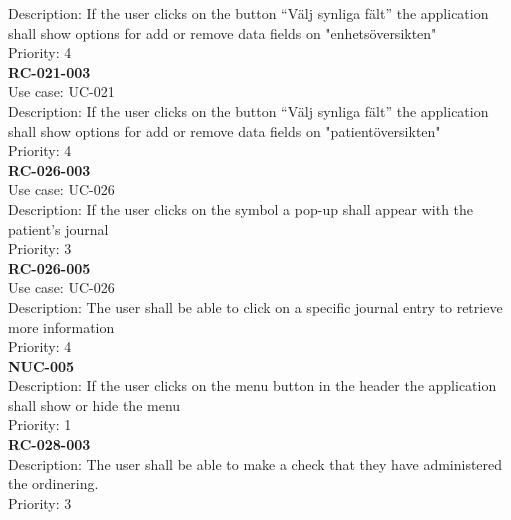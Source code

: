 Description: If the user clicks on the button “Välj synliga fält” the application shall show options for add or remove data fields on "enhetsöversikten"  \\
Priority: 4 \\
\newline
\textbf{RC-021-003} \\
Use case: UC-021 \\
Description: If the user clicks on the button “Välj synliga fält” the application shall show options for add or remove data fields on "patientöversikten" \\
Priority: 4 \\
\newline
\textbf{RC-026-003} \\
Use case: UC-026 \\
Description: If the user clicks on the symbol a pop-up shall appear with the patient’s journal \\
Priority: 3 \\
\newline
\textbf{RC-026-005} \\
Use case: UC-026 \\
Description: The user shall be able to click on a specific journal entry to retrieve more information\\
Priority: 4 \\
\newline
\textbf{NUC-005} \\
Description: If the user clicks on the menu button in the header the application shall show or hide the menu \\
Priority: 1 \\
\newline
\textbf{RC-028-003} \\
Description: The user shall be able to make a check that they have administered the ordinering.  \\
Priority: 3 \\
\newline




